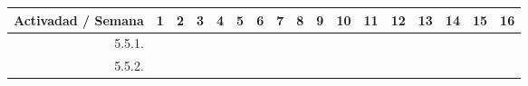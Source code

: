 \documentclass[12pt]{article}
\begin{document}
\begin{table}[H]
{\begin{tabular}{|rllllllllllllllll|}
			\multicolumn{1}{|l|}{\cellcolor[HTML]{D9D9D9}Activadad / Semana}   & \multicolumn{1}{c|}{\cellcolor[HTML]{B6D7A8}1} & \multicolumn{1}{c|}{\cellcolor[HTML]{B6D7A8}2} & \multicolumn{1}{c|}{\cellcolor[HTML]{B6D7A8}3} & \multicolumn{1}{c|}{\cellcolor[HTML]{B6D7A8}4} & \multicolumn{1}{c|}{\cellcolor[HTML]{A4C2F4}5} & \multicolumn{1}{c|}{\cellcolor[HTML]{A4C2F4}6} & \multicolumn{1}{c|}{\cellcolor[HTML]{A4C2F4}7} & \multicolumn{1}{c|}{\cellcolor[HTML]{A4C2F4}8} & \multicolumn{1}{c|}{\cellcolor[HTML]{B4A7D6}9} & \multicolumn{1}{c|}{\cellcolor[HTML]{B4A7D6}10} & \multicolumn{1}{c|}{\cellcolor[HTML]{B4A7D6}11} & \multicolumn{1}{c|}{\cellcolor[HTML]{B4A7D6}12} & \multicolumn{1}{c|}{\cellcolor[HTML]{EA9999}13} & \multicolumn{1}{c|}{\cellcolor[HTML]{EA9999}14} & \multicolumn{1}{c|}{\cellcolor[HTML]{EA9999}15} & \multicolumn{1}{c|}{\cellcolor[HTML]{EA9999}16} \\ \hline
			\multicolumn{1}{|r|}{5.5.1.}                                       & \multicolumn{1}{l|}{}                          & \multicolumn{1}{l|}{}                          & \multicolumn{1}{l|}{}                          & \multicolumn{1}{l|}{}                          & \multicolumn{1}{l|}{}                          & \multicolumn{1}{l|}{}                          & \multicolumn{1}{l|}{}                          & \multicolumn{1}{l|}{}                          & \multicolumn{1}{l|}{}                          & \multicolumn{1}{l|}{}                           & \multicolumn{1}{l|}{}                           & \multicolumn{1}{c|}{\cellcolor[HTML]{B4A7D6}}   & \multicolumn{1}{c|}{\cellcolor[HTML]{B4A7D6}}   & \multicolumn{1}{l|}{}                           & \multicolumn{1}{l|}{}                           &                                                 \\ \hline
			\multicolumn{1}{|r|}{5.5.2.}                                       & \multicolumn{1}{l|}{}                          & \multicolumn{1}{l|}{}                          & \multicolumn{1}{l|}{}                          & \multicolumn{1}{l|}{}                          & \multicolumn{1}{l|}{}                          & \multicolumn{1}{l|}{}                          & \multicolumn{1}{l|}{}                          & \multicolumn{1}{l|}{}                          & \multicolumn{1}{l|}{}                          & \multicolumn{1}{l|}{}                           & \multicolumn{1}{l|}{}                           & \multicolumn{1}{l|}{}                           & \multicolumn{1}{c|}{\cellcolor[HTML]{B4A7D6}}   & \multicolumn{1}{c|}{\cellcolor[HTML]{EA9999}}   & \multicolumn{1}{c|}{\cellcolor[HTML]{EA9999}}   & \multicolumn{1}{c|}{\cellcolor[HTML]{EA9999}}   \\ \hline

\end{tabular}}
\end{table}
\end{document}
